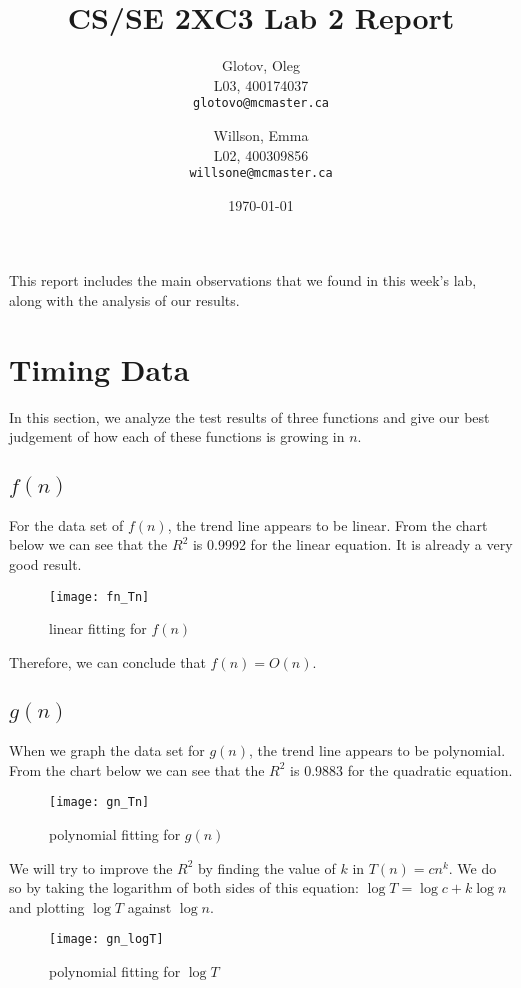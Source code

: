 \documentclass[12pt]{article}
\title{CS/SE 2XC3 Lab 2 Report}
\author{
  Glotov, Oleg\\ L03, 400174037\\
  \texttt{glotovo@mcmaster.ca}
  \and
  Willson, Emma\\ L02, 400309856\\
  \texttt{willsone@mcmaster.ca}
  }
\date{\today}
\begin{document}
\maketitle

This report includes the main observations that we found in this week's lab, along with the analysis of our results.

\newpage 
\section{Timing Data}
In this section, we analyze the test results of three functions and give our best judgement of how each of these functions is growing in $n$.
\subsection{\(f(n)\)}
For the data set of $f(n)$, the trend line appears to be linear. From the chart below we can see that the $R^2$ is 0.9992 for the linear equation. It is already a very good result.

\begin{figure}[h!]
\centering
\texttt{[image: fn\_Tn]}
\caption{linear fitting for $f(n)$}
\label{Figure: fn_1}
\end{figure}
\noindent Therefore, we can conclude that $f(n) = O(n)$. 

\subsection{\(g(n)\)}
When we graph the data set for $g(n)$, the trend line appears to be polynomial. From the chart below we can see that the $R^2$ is 0.9883 for the quadratic equation. 

\begin{figure}[H]
\centering
\texttt{[image: gn\_Tn]}
\caption{polynomial fitting for $g(n)$}
\label{Figure: gn_1}
\end{figure}

\noindent We will try to improve the $R^2$ by finding the value of $k$ in $T(n) = cn^k$. We do so by taking the logarithm of both sides of this equation: $\log{T}=\log{c}+k\log{n}$ and plotting $\log{T}$ against $\log{n}$. 

\begin{figure}[H]
\centering
\texttt{[image: gn\_logT]}
\caption{polynomial fitting for $\log{T}$}
\label{Figure: gn_2}
\end{figure}
\end{document}
